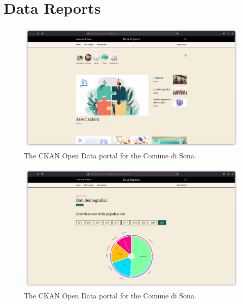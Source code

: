 \section{Data Reports}
\label{sec:datareports-webapp}

\begin{figure}[!ht]
  \centering
  \includegraphics[width=\columnwidth]{images/datareports/datareports-home}
  \caption{The CKAN Open Data portal for the Comune di Sona.}
  \label{fig:data-reports-home}
\end{figure}

\begin{figure}[!ht]
  \centering
  \includegraphics[width=\columnwidth]{images/datareports/datareports-demography}
  \caption{The CKAN Open Data portal for the Comune di Sona.}
  \label{fig:data-reports-demography}
\end{figure}